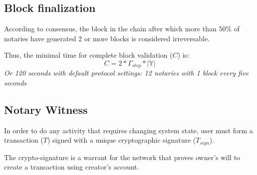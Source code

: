 \documentclass[12pt]{report}
\begin{document}
\subsection{Block finalization}
\label{tech-blockchain-fin}
According to consensus, the block in the chain after which more than 50\% of notaries have generated 2 or more blocks is considered irreversable.

Thus, the minimal time for complete block validation ($C$) is:
\begin{equation}
C = 2 * \Gamma_{step} * |\mathbb{Y}|
\end{equation}
\textit{Or 120 seconds with default protocol settings: 12 notaries with 1 block every five seconds}
\subsection{Notary Witness}
\label{tech-blockchain-confirmation}
In order to do any activity that requires changing system state, user must form a transaction ($T$) signed with a unique cryptographic signature ($T_{sign}$). 

The crypto-signature is a warrant for the network that proves owner's will to create a transaction using creator's account. 
\end{document}
